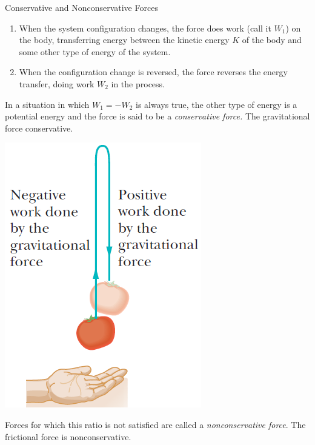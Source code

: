 \documentclass[18pt]{LectMechanics}
\begin{document}
\begin{frame}{Conservative and Nonconservative Forces}{}
	\begin{enumerate}
		\item When the system configuration changes, the force does work (call it $W_1$) on the body, transferring energy between the kinetic energy $K$ of the body and some other type of energy of the system.
		\item  When the configuration change is reversed, the force reverses the energy 	transfer, doing work $W_2$ in the process.
	\end{enumerate}
	\begin{minipage}{0.5\linewidth}
		In a situation in which $W_1 = -W_2$ is always true, the other type of energy is a potential energy and the force is said to be a \emph{conservative force.} The gravitational force conservative.
	\end{minipage}%
	\begin{minipage}{0.5\linewidth}\centering
		\begin{center}
			\includegraphics[width=0.5\linewidth]{UpDownBody}
		\end{center}
	\end{minipage}
	Forces for which this ratio is not satisfied are called a \emph{nonconservative force}. The frictional force is nonconservative.
\end{frame}
\end{document}
